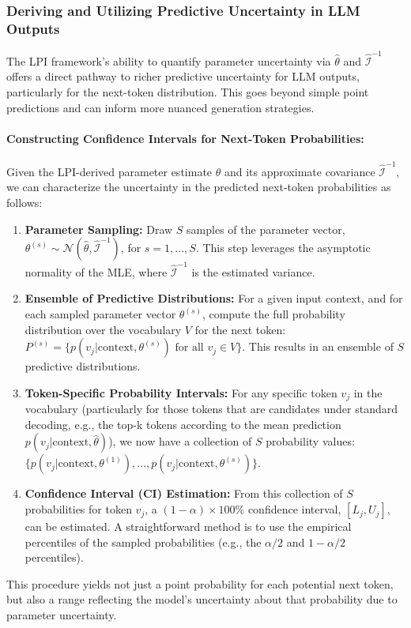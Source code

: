 \documentclass[11pt]{article}
\begin{document}
\subsubsection{Deriving and Utilizing Predictive Uncertainty in LLM Outputs}

The LPI framework's ability to quantify parameter uncertainty via $\hat{\theta}$ and $\hat{\mathcal{I}}^{-1}$ offers a direct pathway to richer predictive uncertainty for LLM outputs, particularly for the next-token distribution. This goes beyond simple point predictions and can inform more nuanced generation strategies.

\paragraph{Constructing Confidence Intervals for Next-Token Probabilities:}
Given the LPI-derived parameter estimate $\hat{\theta}$ and its approximate covariance $\hat{\mathcal{I}}^{-1}$, we can characterize the uncertainty in the predicted next-token probabilities as follows:
\begin{enumerate}
    \item \textbf{Parameter Sampling:} Draw $S$ samples of the parameter vector, $\theta^{(s)} \sim \mathcal{N}(\hat{\theta}, \hat{\mathcal{I}}^{-1})$, for $s=1, \ldots, S$. This step leverages the asymptotic normality of the MLE, where $\hat{\mathcal{I}}^{-1}$ is the estimated variance.
    \item \textbf{Ensemble of Predictive Distributions:} For a given input context, and for each sampled parameter vector $\theta^{(s)}$, compute the full probability distribution over the vocabulary $V$ for the next token: $P^{(s)} = \{p(v_j | \text{context}, \theta^{(s)}) \text{ for all } v_j \in V\}$. This results in an ensemble of $S$ predictive distributions.
    \item \textbf{Token-Specific Probability Intervals:} For any specific token $v_j$ in the vocabulary (particularly for those tokens that are candidates under standard decoding, e.g., the top-k tokens according to the mean prediction $p(v_j | \text{context}, \hat{\theta})$), we now have a collection of $S$ probability values: $\{p(v_j | \text{context}, \theta^{(1)}), \ldots, p(v_j | \text{context}, \theta^{(s)}) \}$.
    \item \textbf{Confidence Interval (CI) Estimation:} From this collection of $S$ probabilities for token $v_j$, a $(1-\alpha) \times 100\%$ confidence interval, $[L_j, U_j]$, can be estimated. A straightforward method is to use the empirical percentiles of the sampled probabilities (e.g., the $\alpha/2$ and $1-\alpha/2$ percentiles).
\end{enumerate}
This procedure yields not just a point probability for each potential next token, but also a range reflecting the model's uncertainty about that probability due to parameter uncertainty.
\end{document}
